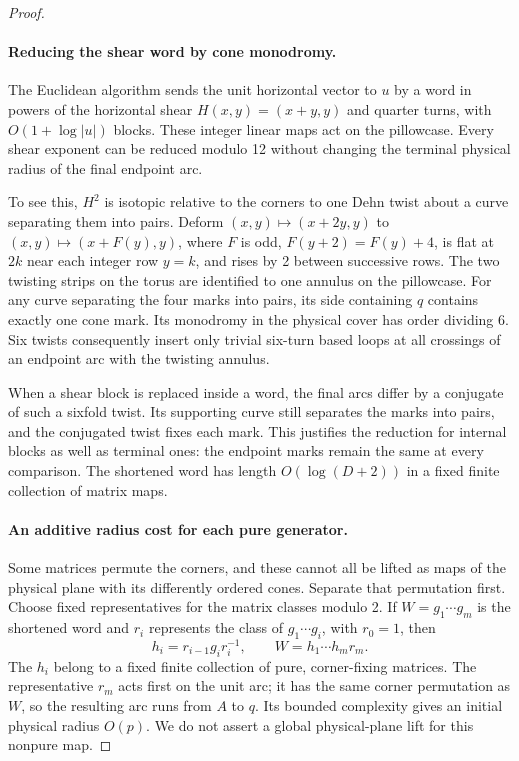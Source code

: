 \begin{proof}
\paragraph{Reducing the shear word by cone monodromy.}
The Euclidean algorithm sends the unit horizontal vector to \(u\) by a
word in powers of the horizontal shear
\(H(x,y)=(x+y,y)\) and quarter turns, with
\(O(1+\log|u|)\) blocks. These integer linear maps act on the pillowcase.
Every shear exponent can be reduced modulo 12 without changing the terminal
physical radius of the final endpoint arc.

To see this, \(H^2\) is isotopic relative to the corners to one Dehn twist
about a curve separating them into pairs. Deform \((x,y)\mapsto(x+2y,y)\)
to \((x,y)\mapsto(x+F(y),y)\), where \(F\) is odd,
\(F(y+2)=F(y)+4\), is flat at \(2k\) near each integer row \(y=k\), and
rises by 2 between successive rows. The two twisting strips on the torus
are identified to one annulus on the pillowcase. For any curve separating
the four marks into pairs, its side containing \(q\) contains exactly one
cone mark. Its monodromy in the physical cover has order dividing 6.
Six twists consequently insert only trivial six-turn based loops at all
crossings of an endpoint arc with the twisting annulus.

When a shear block is replaced inside a word, the final arcs differ by a
conjugate of such a sixfold twist. Its supporting curve still separates the
marks into pairs, and the conjugated twist fixes each mark. This justifies
the reduction for internal blocks as well as terminal ones: the endpoint
marks remain the same at every comparison. The shortened word has length
\(O(\log(D+2))\) in a fixed finite collection of matrix maps.

\paragraph{An additive radius cost for each pure generator.}
Some matrices permute the corners, and these cannot all be lifted as maps
of the physical plane with its differently ordered cones. Separate that
permutation first. Choose fixed representatives for the matrix classes
modulo 2. If \(W=g_1\cdots g_m\) is the shortened word and \(r_i\) represents
the class of \(g_1\cdots g_i\), with \(r_0=1\), then
\[
 h_i=r_{i-1}g_i r_i^{-1},\qquad W=h_1\cdots h_m r_m.
\]
The \(h_i\) belong to a fixed finite collection of pure, corner-fixing
matrices. The representative \(r_m\) acts first on the unit arc; it has the
same corner permutation as \(W\), so the resulting arc runs from \(A\)
to \(q\). Its bounded complexity gives an initial physical radius \(O(p)\).
We do not assert a global physical-plane lift for this nonpure map.


\end{proof}

